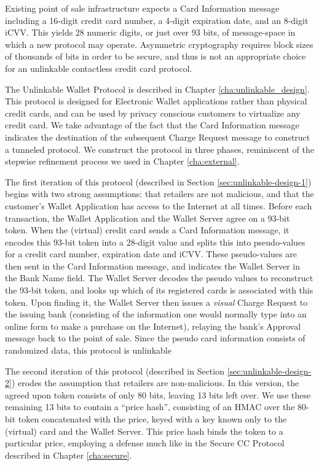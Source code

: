 Existing point of sale infrastructure expects a Card Information message including a 16-digit credit card number, a 4-digit expiration date, and an 8-digit iCVV.
This yields 28 numeric digits, or just over 93 bits, of message-space in which a new protocol may operate.
Asymmetric cryptography requires block sizes of thousands of bits in order to be secure, and thus is not an appropriate choice for an unlinkable contactless credit card protocol.


The Unlinkable Wallet Protocol is described in Chapter \ref{cha:unlinkable_design}.
This protocol is designed for Electronic Wallet applications rather than physical credit cards, and can be used by privacy conscious customers to virtualize any credit card.
We take advantage of the fact that the Card Information message indicates the destination of the subsequent Charge Request message to construct a tunneled protocol.
We construct the protocol in three phases, reminiscent of the stepwise refinement process we used in Chapter \ref{cha:external}.

The first iteration of this protocol (described in Section \ref{sec:unlinkable-design-1}) begins with two strong assumptions:
    that retailers are not malicious, and that the customer's Wallet Application has access to the Internet at all times.
Before each transaction, the Wallet Application and the Wallet Server agree on a 93-bit token.
When the (virtual) credit card sends a Card Information message, it encodes this 93-bit token into a 28-digit value and splits this into pseudo-values for a credit card number, expiration date and iCVV.
These pseudo-values are then sent in the Card Information message, and indicates the Wallet Server in the Bank Name field.
The Wallet Server decodes the pseudo values to reconstruct the 93-bit token, and looks up which of its registered cards is associated with this token.
Upon finding it, the Wallet Server then issues a \emph{visual} Charge Request to the issuing bank
    (consisting of the information one would normally type into an online form to make a purchase on the Internet),
    relaying the bank's Approval message back to the point of sale.
Since the pseudo card information consists of randomized data, this protocol is unlinkable

The second iteration of this protocol (described in Section \ref{sec:unlinkable-design-2}) erodes the assumption that retailers are non-malicious.
In this version, the agreed upon token consists of only 80 bits, leaving 13 bits left over.
We use these remaining 13 bits to contain a ``price hash'',
    consisting of an HMAC over the 80-bit token concatenated with the price, keyed with a key known only to the (virtual) card and the Wallet Server.
This price hash binds the token to a particular price, employing a defense much like in the Secure CC Protocol described in Chapter \ref{cha:secure}.

